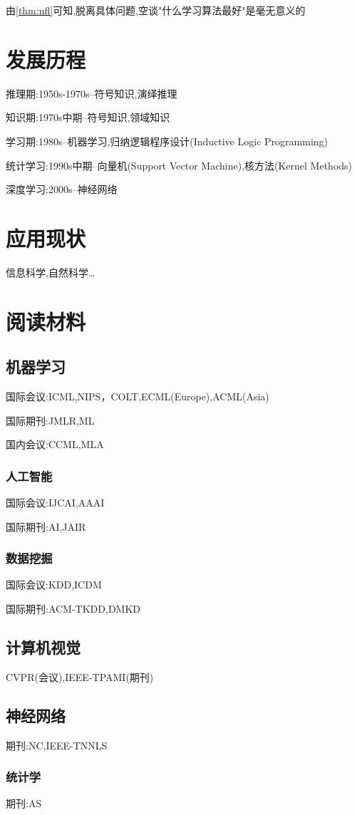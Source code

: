 由\ref{thm:nfl}可知,脱离具体问题,空谈"什么学习算法最好"是毫无意义的
\section{发展历程}
推理期:1950s-1970s--符号知识,演绎推理

知识期:1970s中期--符号知识,领域知识

学习期:1980s--机器学习,归纳逻辑程序设计(Inductive Logic Programming)

统计学习:1990s中期--向量机(Support Vector Machine),核方法(Kernel Methods)

深度学习:2000s--神经网络

\section{应用现状}
信息科学,自然科学\dots

\section{阅读材料}
\subsection{机器学习}
国际会议:ICML,NIPS，COLT,ECML(Europe),ACML(Asia)

国际期刊:JMLR,ML

国内会议:CCML,MLA

\subsubsection{人工智能}
国际会议:IJCAI,AAAI

国际期刊:AI,JAIR

\subsubsection{数据挖掘}
国际会议:KDD,ICDM

国际期刊:ACM-TKDD,DMKD

\subsection{计算机视觉}
CVPR(会议),IEEE-TPAMI(期刊)

\subsection{神经网络}
期刊:NC,IEEE-TNNLS
\subsubsection{统计学}
期刊:AS

